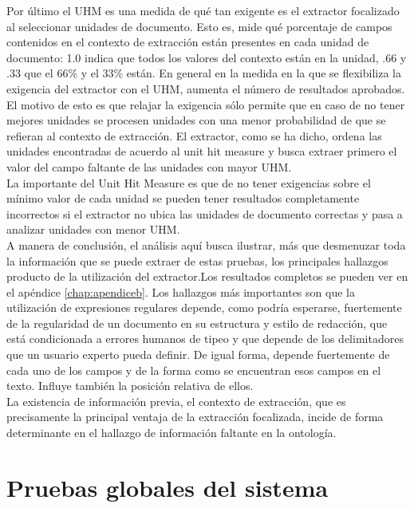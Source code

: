 Por último el UHM es una medida de qué tan exigente es el extractor focalizado al seleccionar unidades de documento. Esto es, mide qué porcentaje de campos contenidos en el contexto de extracción están presentes en cada unidad de documento: 1.0 indica que todos los valores del contexto están en la unidad, .66 y .33 que el 66\% y el 33\% están. En general en la medida en la que se flexibiliza la exigencia del extractor con el UHM, aumenta el número de resultados aprobados. El motivo de esto es que relajar la exigencia sólo permite que en caso de no tener mejores unidades se procesen unidades con una menor probabilidad de que se refieran al contexto de extracción. El extractor, como se ha dicho, ordena las unidades encontradas de acuerdo al unit hit measure y busca extraer primero el valor del campo faltante de las unidades con mayor UHM. \\

La importante del Unit Hit Measure es que de no tener exigencias sobre el mínimo valor de cada unidad se pueden tener resultados completamente incorrectos si el extractor no ubica las unidades de documento correctas y pasa a analizar unidades con menor UHM. \\

A manera de conclusión, el análisis aquí busca ilustrar, más que desmenuzar toda la información que se puede extraer de estas pruebas, los principales hallazgos producto de la utilización del extractor.Los resultados completos se pueden ver en el apéndice \ref{chap:apendiceb}.  Los hallazgos más importantes son que la utilización de expresiones regulares depende, como podría esperarse, fuertemente de la regularidad de un documento en su estructura y estilo de redacción, que está condicionada a errores humanos de tipeo y que depende de los delimitadores que un usuario experto pueda definir. De igual forma, depende fuertemente de cada uno de los campos y de la forma como se encuentran esos campos en el texto. Influye también la posición relativa de ellos.\\

La existencia de información previa, el contexto de extracción, que es precisamente la principal ventaja de la extracción focalizada, incide de forma determinante en el hallazgo de información faltante en la ontología.\\

\section{Pruebas globales del sistema}

